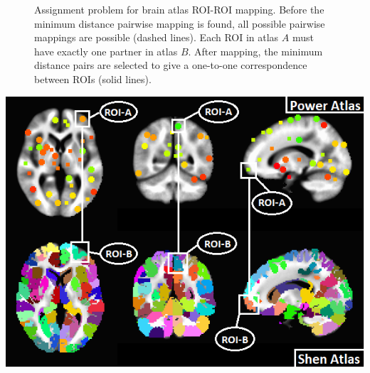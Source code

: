 \documentclass[10pt,letterpaper]{article}\usepackage[]{graphicx}\usepackage[]{color}
\begin{document}
\begin{figure}[h!]
	\centering
	\caption{Assignment problem for brain atlas ROI-ROI mapping. Before the minimum distance pairwise mapping is found, all possible pairwise mappings are possible (dashed lines). Each ROI in atlas $A$ must have exactly one partner in atlas $B$. After mapping, the minimum distance pairs are selected to give a one-to-one correspondence between ROIs (solid lines).}\label{fig:assignment_atlases}
\end{figure}

{\centering
	\begin{minipage}[c]{0.55\textwidth}
		\includegraphics[width=1\textwidth,clip,trim=0cm 0cm 0cm 0.0cm]{power_shen_montage_mapped.png}
	\end{minipage}\hfill
	\begin{minipage}[c]{0.43\textwidth}
		\captionsetup{type=figure}\label{fig:power_shen_mapped}
\end{minipage}}
\end{document}
